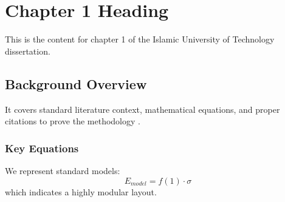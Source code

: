 \chapter{Chapter 1 Heading}
\label{ch:chapter1}
This is the content for chapter 1 of the Islamic University of Technology dissertation.

\section{Background Overview}
It covers standard literature context, mathematical equations, and proper citations to prove the methodology \cite{texbook}.

\subsection{Key Equations}
We represent standard models:
\begin{equation}
    E_{model} = f(1) \cdot \sigma
\end{equation}
which indicates a highly modular layout.
